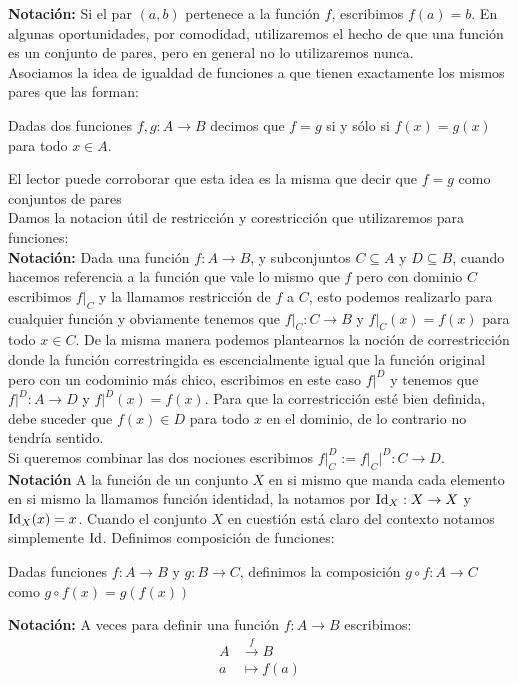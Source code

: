 \documentclass[12pt,a4paper]{book}
\begin{document}
\textbf{Notación:} Si el par $(a,b)$ pertenece a la función $f$, escribimos $f(a)=b$. En algunas oportunidades, por comodidad, utilizaremos el hecho de que una función es un conjunto de pares, pero en general no lo utilizaremos nunca.\\[0.5cm]
Asociamos la idea de igualdad de funciones a que tienen exactamente los mismos pares que las forman:
\begin{defi} Dadas dos funciones $f,g:A \rightarrow B$ decimos que $f = g$ si y sólo si $f(x) = g(x)$ para todo $x \in A$.
\end{defi}
El lector puede corroborar que esta idea es la misma que decir que $f=g$ como conjuntos de pares\\[0.5cm]
Damos la notacion útil de restricción y corestricción que utilizaremos para funciones:\\
\textbf{Notación:} Dada una función $f:A \rightarrow B$, y subconjuntos $C \subseteq A$ y $D \subseteq B$, cuando hacemos referencia a la función que vale lo mismo que $f$ pero con dominio $C$ escribimos $f \vert_C$ y la llamamos restricción de $f$ a $C$, esto podemos realizarlo para cualquier función y obviamente tenemos que $f \vert_C : C \rightarrow B$ y $f \vert_C (x) = f(x)$ para todo $x \in C$. De la misma manera podemos plantearnos la noción de correstricción donde la función correstringida es escencialmente igual que la función original pero con un codominio más chico, escribimos en este caso $f \vert^D$ y tenemos que $f \vert^D :A \rightarrow D$ y $f \vert^D(x) = f(x)$. Para que la correstricción esté bien definida, debe suceder que $f(x) \in D$ para todo $x$ en el dominio, de lo contrario no tendría sentido.\\
Si queremos combinar las dos nociones escribimos $f \vert_C^D := f \vert_C \vert^D : C \rightarrow D$.\\[0.5cm]
\textbf{Notación} A la función de un conjunto $X$ en si mismo que manda cada elemento en si mismo la llamamos función identidad, la notamos por $\mbox{Id}_X : X \rightarrow X$ y $\mbox{Id}_X(x)=x$. Cuando el conjunto $X$ en cuestión está claro del contexto notamos simplemente $\mbox{Id}$.
Definimos composición de funciones:
\begin{defi} Dadas funciones $f:A \rightarrow B$ y $g: B \rightarrow C$, definimos la composición $g \circ f:A \rightarrow C$ como $g\circ f(x) = g(f(x))$
\end{defi}
\textbf{Notación:} A veces para definir una función $f:A \rightarrow B$ escribimos:
\begin{align*}
A &\overset{f}{\longrightarrow} B \\
a &\longmapsto f(a)
\end{align*}
\end{document}
